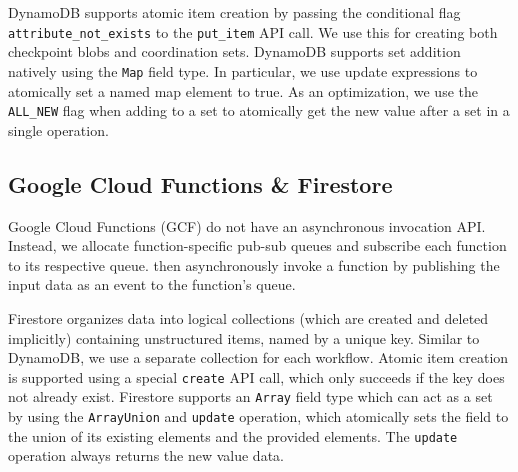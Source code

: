 DynamoDB supports atomic item creation by passing the conditional flag
\texttt{attribute\_not\_exists} to the \texttt{put\_item} API call. We use
this for creating both checkpoint blobs and coordination sets. DynamoDB
supports set addition natively using the \texttt{Map} field type. In
particular, we use update expressions to atomically set a named map element to
true.  As an optimization, we use the \texttt{ALL\_NEW} flag when adding to a
set to atomically get the new value after a set in a single operation.

\subsection{Google Cloud Functions \& Firestore}

Google Cloud Functions (GCF) do not have an asynchronous invocation API.
Instead, we allocate function-specific pub-sub queues and subscribe each
function to its respective queue.  \name{} then asynchronously invoke a
function by publishing the input data as an event to the function's queue.


Firestore organizes data into logical collections (which are created and
deleted implicitly) containing unstructured items, named by a unique key.
Similar to DynamoDB, we use a separate collection for each workflow. Atomic
item creation is supported using a special \texttt{create} API call, which
only succeeds if the key does not already exist. Firestore supports an
\texttt{Array} field type which can act as a set by using the
\texttt{ArrayUnion} and \texttt{update} operation, which atomically sets the
field to the union of its existing elements and the provided elements. The
\texttt{update} operation always returns the new value data.
